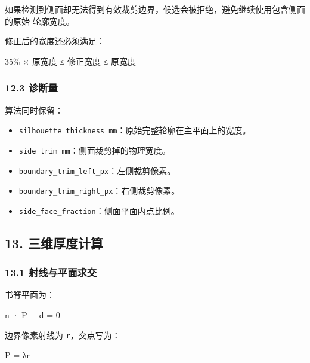 \documentclass[
  chinese,
  11pt,
  a4paper,
]{article}
\newenvironment{Shaded}{\begin{snugshade}}{\end{snugshade}}
\newcommand{\NormalTok}[1]{#1}
\providecommand{\tightlist}{%
  \setlength{\itemsep}{0pt}\setlength{\parskip}{0pt}}
\begin{document}
如果检测到侧面却无法得到有效裁剪边界，候选会被拒绝，避免继续使用包含侧面的原始
轮廓宽度。

修正后的宽度还必须满足：

\begin{Shaded}
\begin{Highlighting}[]
\NormalTok{35\% × 原宽度 ≤ 修正宽度 ≤ 原宽度}
\end{Highlighting}
\end{Shaded}

\subsubsection{12.3 诊断量}\label{123-ux8bcaux65adux91cf}

算法同时保留：

\begin{itemize}
\tightlist
\item
  \texttt{silhouette\_thickness\_mm}：原始完整轮廓在主平面上的宽度。
\item
  \texttt{side\_trim\_mm}：侧面裁剪掉的物理宽度。
\item
  \texttt{boundary\_trim\_left\_px}：左侧裁剪像素。
\item
  \texttt{boundary\_trim\_right\_px}：右侧裁剪像素。
\item
  \texttt{side\_face\_fraction}：侧面平面内点比例。
\end{itemize}

\subsection{13.
三维厚度计算}\label{13-ux4e09ux7ef4ux539aux5ea6ux8ba1ux7b97}

\subsubsection{13.1
射线与平面求交}\label{131-ux5c04ux7ebfux4e0eux5e73ux9762ux6c42ux4ea4}

书脊平面为：

\begin{Shaded}
\begin{Highlighting}[]
\NormalTok{n · P + d = 0}
\end{Highlighting}
\end{Shaded}

边界像素射线为 \texttt{r}，交点写为：

\begin{Shaded}
\begin{Highlighting}[]
\NormalTok{P = λr}
\end{Highlighting}
\end{Shaded}
\end{document}

